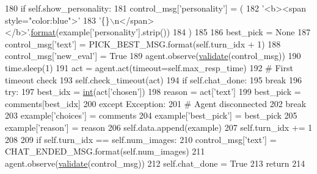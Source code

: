 \begin{DoxyCode}
180             \textcolor{keywordflow}{if} self.show\_personality:
181                 control\_msg[\textcolor{stringliteral}{'personality'}] = (
182                     \textcolor{stringliteral}{'<b><span style="color:blue">'}
183                     \textcolor{stringliteral}{'\{\}\(\backslash\)n</span></b>'}.\hyperlink{namespaceparlai_1_1chat__service_1_1services_1_1messenger_1_1shared__utils_a32e2e2022b824fbaf80c747160b52a76}{format}(example[\textcolor{stringliteral}{'personality'}].strip())
184                 )
185 
186             best\_pick = \textcolor{keywordtype}{None}
187             control\_msg[\textcolor{stringliteral}{'text'}] = PICK\_BEST\_MSG.format(self.turn\_idx + 1)
188             control\_msg[\textcolor{stringliteral}{'new\_eval'}] = \textcolor{keyword}{True}
189             agent.observe(\hyperlink{namespaceparlai_1_1core_1_1worlds_afc3fad603b7bce41dbdc9cdc04a9c794}{validate}(control\_msg))
190             time.sleep(1)
191             act = agent.act(timeout=self.max\_resp\_time)
192             \textcolor{comment}{# First timeout check}
193             self.check\_timeout(act)
194             \textcolor{keywordflow}{if} self.chat\_done:
195                 \textcolor{keywordflow}{break}
196             \textcolor{keywordflow}{try}:
197                 best\_idx = \hyperlink{namespacelanguage__model_1_1eval__ppl_a7d12ee00479673c5c8d1f6d01faa272a}{int}(act[\textcolor{stringliteral}{'chosen'}])
198                 reason = act[\textcolor{stringliteral}{'text'}]
199                 best\_pick = comments[best\_idx]
200             \textcolor{keywordflow}{except} Exception:
201                 \textcolor{comment}{# Agent disconnected}
202                 \textcolor{keywordflow}{break}
203             example[\textcolor{stringliteral}{'choices'}] = comments
204             example[\textcolor{stringliteral}{'best\_pick'}] = best\_pick
205             example[\textcolor{stringliteral}{'reason'}] = reason
206             self.data.append(example)
207             self.turn\_idx += 1
208 
209         \textcolor{keywordflow}{if} self.turn\_idx == self.num\_images:
210             control\_msg[\textcolor{stringliteral}{'text'}] = CHAT\_ENDED\_MSG.format(self.num\_images)
211             agent.observe(\hyperlink{namespaceparlai_1_1core_1_1worlds_afc3fad603b7bce41dbdc9cdc04a9c794}{validate}(control\_msg))
212         self.chat\_done = \textcolor{keyword}{True}
213         \textcolor{keywordflow}{return}
214 
\end{DoxyCode}
\mbox{\label{classstack__rank__evals_1_1worlds_1_1MTurkPersonalityCaptionsStackRankWorld_a2dd08f9107fee17e2833a529681d76db}} 
